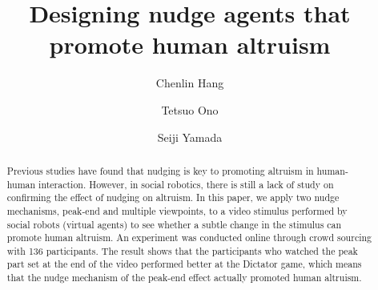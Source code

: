 \documentclass[runningheads]{llncs}
\begin{document}
%
\title{Designing nudge agents that promote human altruism}
%
%
\author{Chenlin Hang\and
Tetsuo Ono \and
Seiji Yamada}
%
%
\maketitle              %
%
\begin{abstract}
Previous studies have found that nudging is key to promoting altruism in human-human interaction. However, in social robotics, there is still a lack of study on confirming the effect of nudging on altruism. In this paper, we apply two nudge mechanisms, peak-end and multiple viewpoints, to a video stimulus performed by social robots (virtual agents) to see whether a subtle change in the stimulus can promote human altruism. An experiment was conducted online through crowd sourcing with 136 participants. The result shows that the participants who watched the peak part set at the end of the video performed better at the Dictator game, which means that the nudge mechanism of the peak-end effect actually promoted human altruism.

\end{abstract}
%
%
%
\end{document}
